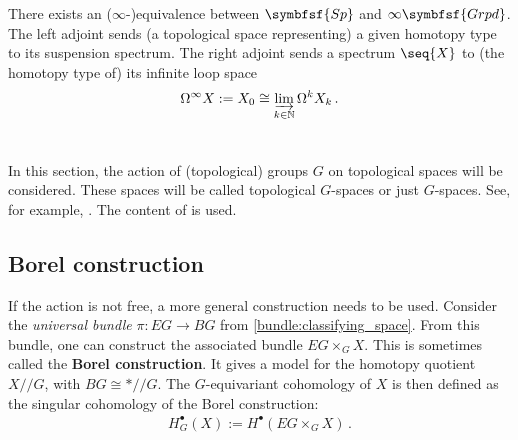     \begin{property}
        There exists an ($\infty$-)equivalence between $\symbfsf{Sp}$ and $\infty\symbfsf{Grpd}$. The left adjoint sends (a topological space representing) a given homotopy type to its suspension spectrum. The right adjoint sends a spectrum $\seq{X}$ to (the homotopy type of) its infinite loop space
        \begin{gather}
            \Omega^\infty X:=X_0\cong\varinjlim_{k\in\mathbb{N}}\Omega^kX_k\,.
        \end{gather}
    \end{property}

\section{}

    In this section, the action of (topological) groups $G$ on topological spaces will be considered. These spaces will be called topological $G$-spaces or just $G$-spaces. See, for example, \citet{cartier_mad_2001,rozenblyum_bung_2023}. The content of  is used.

\subsection{Borel construction}


    If the action is not free, a more general construction needs to be used. Consider the \textit{universal bundle} $\pi:EG\rightarrow BG$ from \cref{bundle:classifying_space}. From this bundle, one can construct the associated bundle $EG\times_G X$. This is sometimes called the \textbf{Borel construction}. It gives a model for the homotopy quotient $X/\!\!/G$, with $BG\cong\ast/\!\!/G$. The $G$-equivariant cohomology of $X$ is then defined as the singular cohomology of the Borel construction:
    \begin{gather}
        H_G^\bullet(X) := H^\bullet(EG\times_GX)\,.
    \end{gather}

